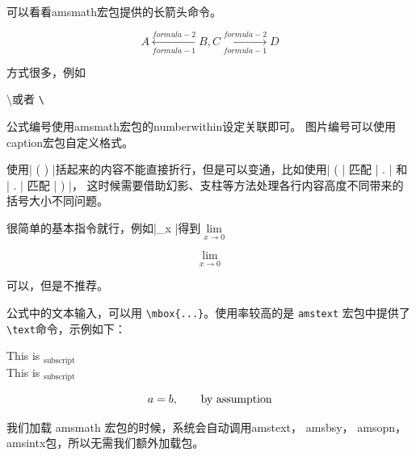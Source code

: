 可以看看amsmath宏包提供的长箭头命令。
\begin{example}
\[
  A \xleftarrow[formula-1]{formula-2} B,
  C \xrightarrow[formula-1]{formula-2} D
\]

\end{example}

方式很多，例如
\begin{example}
  \textbackslash \quad 或者 \quad \verb|\|
\end{example}
%



公式编号使用amsmath宏包的numberwithin设定关联即可。
图片编号可以使用caption宏包自定义格式。

使用| \left( \right) |括起来的内容不能直接折行，但是可以变通，比如使用| \left( | 匹配 | \right. | 和 | \left. | 匹配 | \right) |，
这时候需要借助幻影、支柱等方法处理各行内容高度不同带来的括号大小不同问题。

很简单的基本指令就行，例如|\lim\limits_{x }|得到$\lim\limits_{x \to 0}$
\begin{example}
\[
  \lim\limits_{x \to 0}
\]
\end{example}

可以，但是不推荐。

公式中的文本输入，可以用 \verb|\mbox{...}|。使用率较高的是 \texttt{amstext} 宏包中提供了\verb|\text|命令，示例如下：
\begin{example}
\begin{center}
  This is $_{\text{subscript}}$\\
  This is $_{\mbox{subscript}}$
\end{center}
\[a = b, \text{\qquad by assumption}\]
\end{example}

	我们加载 amsmath 宏包的时候，系统会自动调用amstext， amsbsy， amsopn，
	amsintx包，所以无需我们额外加载包。

